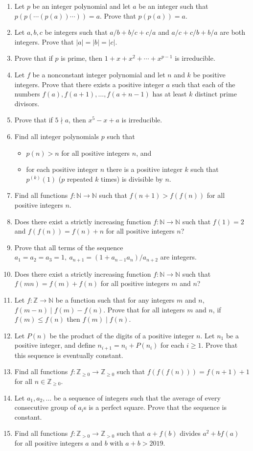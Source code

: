 \documentclass{article}
\newcommand\Zz{\mathbb{Z}}
\newcommand\Nn{\mathbb{N}}
\begin{document}
\begin{enumerate}
  \item Let $p$ be an integer polynomial and let $a$ be an integer such that
    $p(p(\cdots(p(a))\cdots))=a$. Prove that $p(p(a))=a$.
  \item Let $a,b,c$ be integers such that $a/b+b/c+c/a$ and $a/c+c/b+b/a$ are
    both integers. Prove that $|a|=|b|=|c|$.
  \item Prove that if $p$ is prime, then $1+x+x^2+\cdots+x^{p-1}$ is
    irreducible.
  \item Let $f$ be a nonconstant integer polynomial and let $n$ and $k$ be
    positive integers. Prove that there exists a positive integer $a$ such that
    each of the numbers $f(a),f(a+1),\ldots,f(a+n-1)$ has at least $k$ distinct
    prime divisors.
  \item Prove that if $5\nmid a$, then $x^5-x+a$ is irreducible.
  \item Find all integer polynomials $p$ such that
    \begin{itemize}
      \item $p(n)>n$ for all positive integers $n$, and
      \item for each positive integer $n$ there is a positive integer $k$ such
        that $p^{(k)}(1)$ ($p$ repeated $k$ times) is divisible by $n$.
    \end{itemize}
  \item Find all functions $f:\Nn\to\Nn$ such that $f(n+1)>f(f(n))$ for all
    positive integers $n$.
  \item Does there exist a strictly increasing function $f:\Nn\to\Nn$ such that
    $f(1)=2$ and $f(f(n))=f(n)+n$ for all positive integers $n$?
  \item Prove that all terms of the sequence $a_1=a_2=a_3=1,\
    a_{n+1}=(1+a_{n-1}a_n)/a_{n+2}$ are integers.
  \item Does there exist a strictly increasing function $f:\Nn\to\Nn$ such that
    $f(mn)=f(m)+f(n)$ for all positive integers $m$ and $n$?
  \item Let $f:\Zz\to\Nn$ be a function such that for any integers $m$ and $n$,
    $f(m-n)\mid f(m)-f(n)$. Prove that for all integers $m$ and $n$, if $f(m)\le
    f(n)$ then $f(m)\mid f(n)$.
  \item Let $P(n)$ be the product of the digits of a positive integer $n$.
    Let $n_1$ be a positive integer, and define $n_{i+1}=n_i+P(n_i)$ for each
    $i\ge 1$. Prove that this sequence is eventually constant.
  \item Find all functions $f:\Zz_{\ge 0}\to \Zz_{\ge 0}$ such that
    $f(f(f(n)))=f(n+1)+1$ for all $n\in\Zz_{\ge 0}$.
  \item Let $a_1,a_2,\ldots$ be a sequence of integers such that the average of
    every consecutive group of $a_i$s is a perfect square. Prove that the
    sequence is constant.
  \item  Find all functions $f:\mathbb Z_{>0}\to \mathbb Z_{>0}$ such that
    $a+f(b)$ divides $a^2+bf(a)$ for all positive integers $a$ and $b$ with
    $a+b>2019$.
\end{enumerate}
\end{document}
